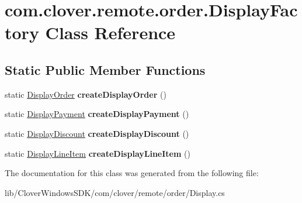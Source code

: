 \hypertarget{classcom_1_1clover_1_1remote_1_1order_1_1_display_factory}{}\section{com.\+clover.\+remote.\+order.\+Display\+Factory Class Reference}
\label{classcom_1_1clover_1_1remote_1_1order_1_1_display_factory}
\subsection*{Static Public Member Functions}
\begin{DoxyCompactItemize}
\item 
\mbox{\label{classcom_1_1clover_1_1remote_1_1order_1_1_display_factory_a7cde52879c3985866042d4003f84f707}} 
static \hyperlink{classcom_1_1clover_1_1remote_1_1order_1_1_display_order}{Display\+Order} {\bfseries create\+Display\+Order} ()
\item 
\mbox{\label{classcom_1_1clover_1_1remote_1_1order_1_1_display_factory_aaadbdd4904ce0d467b0f72f09c8cca0b}} 
static \hyperlink{classcom_1_1clover_1_1remote_1_1order_1_1_display_payment}{Display\+Payment} {\bfseries create\+Display\+Payment} ()
\item 
\mbox{\label{classcom_1_1clover_1_1remote_1_1order_1_1_display_factory_a14100724948cd140871689bbfcd4fa68}} 
static \hyperlink{classcom_1_1clover_1_1remote_1_1order_1_1_display_discount}{Display\+Discount} {\bfseries create\+Display\+Discount} ()
\item 
\mbox{\label{classcom_1_1clover_1_1remote_1_1order_1_1_display_factory_a8f52f32167d86c81caaebdd5debb4d70}} 
static \hyperlink{classcom_1_1clover_1_1remote_1_1order_1_1_display_line_item}{Display\+Line\+Item} {\bfseries create\+Display\+Line\+Item} ()
\end{DoxyCompactItemize}


The documentation for this class was generated from the following file\+:\begin{DoxyCompactItemize}
\item 
lib/\+Clover\+Windows\+S\+D\+K/com/clover/remote/order/Display.\+cs\end{DoxyCompactItemize}
